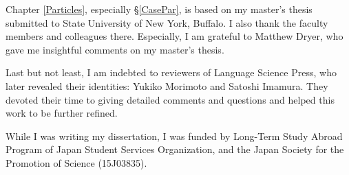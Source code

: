\begin{refsection}
Chapter \ref{Particles}, especially \S \ref{CasePar}, is based on my master's thesis
submitted to State University of New York, Buffalo.
I also thank the faculty members and colleagues there.
Especially, I am grateful to Matthew Dryer,
who gave me insightful comments on my master's thesis.

Last but not least,
I am indebted to reviewers of Language Science Press,
who later revealed their identities: Yukiko Morimoto and Satoshi Imamura.
They devoted their time to giving detailed comments and questions and
helped this work to be further refined.

While I was writing my dissertation,
I was funded by Long-Term Study Abroad Program of Japan Student Services Organization,
and the Japan Society for the Promotion of Science (15J03835).

\end{refsection}

